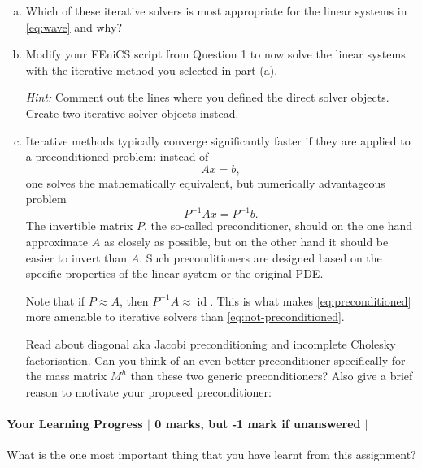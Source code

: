 \documentclass[10pt,letterpaper]{scrartcl}
\begin{document}
\begin{enumerate}[(a)]
\item Which of these iterative solvers is most appropriate for the linear systems in \eqref{eq:wave} and why?

\vfill

\item Modify your \textsf{FEniCS} script from Question 1 to now solve the linear systems with the iterative method you selected in part (a).

\emph{Hint:} Comment out the lines where you defined the direct solver objects. Create two iterative solver objects instead.

\item Iterative methods typically converge significantly faster if they are applied to a preconditioned problem: instead of
\begin{equation}\label{eq:not-preconditioned}
Ax=b,
\end{equation}
one solves the mathematically equivalent, but numerically advantageous problem
\begin{equation}\label{eq:preconditioned}
P^{-1}Ax = P^{-1} b.
\end{equation}
The invertible matrix $P$, the so-called preconditioner, should on the one hand approximate $A$ as closely as possible, but on the other hand it should be easier to invert than $A$. Such preconditioners are designed based on the specific properties of the linear system or the original PDE.

Note that if $P \approx A$, then $P^{-1}A \approx \operatorname{id}$. This is what makes \eqref{eq:preconditioned} more amenable to iterative solvers than \eqref{eq:not-preconditioned}. 

Read about diagonal aka Jacobi preconditioning and incomplete Cholesky factorisation. Can you think of an even better preconditioner specifically for the mass matrix $M^h$ than these two generic preconditioners? Also give a brief reason to motivate your proposed preconditioner:

\vfill
\end{enumerate}


\paragraph*{Your Learning Progress $\vert$ 0 marks, but -1 mark if unanswered $\vert$ \faFilePdfO}
What is the one most important thing that you have learnt from this assignment?
\end{document}
